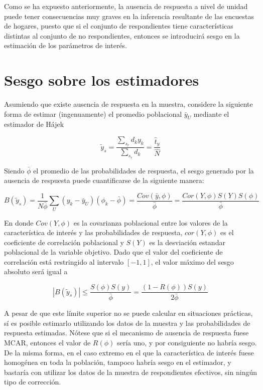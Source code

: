 \documentclass[
  12pt,
  spanish,
]{book}
\begin{document}
Como se ha expuesto anteriormente, la ausencia de respuesta a nivel de unidad puede tener consecuencias muy graves en la inferencia resultante de las encuestas de hogares, puesto que si el conjunto de respondientes tiene características distintas al conjunto de no respondientes, entonces se introducirá sesgo en la estimación de los parámetros de interés.

\hypertarget{sesgo-sobre-los-estimadores}{%
\section{Sesgo sobre los estimadores}\label{sesgo-sobre-los-estimadores}}

Asumiendo que existe ausencia de respuesta en la muestra, considere la siguiente forma de estimar (ingenuamente) el promedio poblacional \(\bar{y}_U\) mediante el estimador de Hájek

\[
\tilde{y}_s = \frac{\sum_{s_r}d_ky_k}{\sum_{s_r}d_k} = \frac{\hat{t}_y}{\hat{N}}
\]

Siendo \(\bar{\phi}\) el promedio de las probabilidades de respuesta, el sesgo generado por la ausencia de respuesta puede cuantificarse de la siguiente manera:

\[
B\left(\tilde{y}_s\right)  = 
\frac{1}{N\bar{\phi}}\sum_U(y_k-\bar{y}_U)(\phi_k-\bar{\phi})
= \frac{Cov\left(\bar{y},\phi\right)}{\bar{\phi}}
= \frac{Cor\left(Y,\phi\right)S\left(Y\right)S\left(\phi\right)}{\bar{\phi}}
\]

En donde \(Cov\left(Y,\phi\right)\) es la covarianza poblacional entre
los valores de la característica de interés y las probabilidades de respuesta,
\(cor\left(Y,\phi\right)\) es el coeficiente de correlación poblacional
y \(S\left(Y\right)\) es la desviación estandar poblacional de la variable objetivo. Dado que el valor del coeficiente de correlación está restringido
al intervalo \([-1, 1]\), el valor máximo del sesgo absoluto será igual a

\[
|B\left(\tilde{y}_s\right)| \leq 
\frac{S\left(\phi\right)S\left(y\right)}{\bar{\phi}}
= \frac{\left(1-R\left(\phi\right)\right)S\left(y\right)}{2\bar{\phi}}
\]

A pesar de que este límite superior no se puede calcular en situaciones prácticas, sí es posible estimarlo utilizando los datos de la muestra y las probabilidades
de respuesta estimadas. Nótese que si el mecanismo de ausencia de respuesta fuese MCAR, entonces el valor de \(R\left(\phi\right)\) sería uno, y por consiguiente no habría sesgo. De la misma forma, en el caso extremo en el que la característica de interés fuese homogénea en toda la población, tampoco habría sesgo en el estimador, y bastaría con utilizar los datos de la muestra de respondientes efectivos, sin ningún tipo de corrección.
\end{document}
